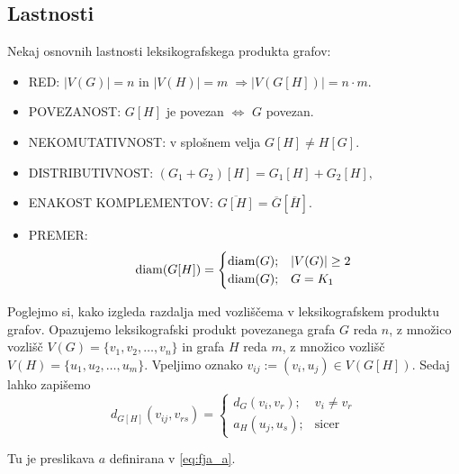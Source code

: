 \documentclass[mat1, tisk]{fmfdelo}
\newcommand{\1}{(1, 1, \ldots, 1)}
\newcommand{\2}{(2, 2, \ldots, 2)}
\begin{document}


\subsection{Lastnosti} \label{ss:lastnosti_leks_prod}
Nekaj osnovnih lastnosti leksikografskega produkta grafov:
\begin{itemize}
    \item RED: $|V(G)| = n$ in $|V(H)| = m \; \Rightarrow |V(G[H])| = n \cdot m.$
    \item POVEZANOST: $G[H]$ je povezan $\Leftrightarrow$ $G$ povezan. 
    \item NEKOMUTATIVNOST: v splošnem velja $G[H] \neq H[G].$
    \item DISTRIBUTIVNOST: $(G_1 + G_2)[H] = G_1[H] + G_2[H],$ 
    \item ENAKOST KOMPLEMENTOV: $\overline{G[H]} = \overline{G} [\overline{H}].$
    \item PREMER: $$ {\rm diam}(G[H]) =  \begin{cases} 
        {\rm diam}(G); & |V(G)| \geq 2 \\
        {\rm diam}(G); & G = K_1
        \end{cases}$$

\end{itemize}

Poglejmo si, kako izgleda razdalja med vozliščema v leksikografskem produktu grafov. 
Opazujemo leksikografski produkt povezanega grafa $G$ reda $n$, z množico vozlišč
$V(G) = \{v_1, v_2, \ldots , v_n \}$ in grafa $H$ reda $m$, z množico vozlišč 
$V(H) = \{u_1, u_2, \ldots , u_m \}$. Vpeljimo oznako 
$v_{ij} := (v_i, u_j) \in V(G[H]).$
Sedaj lahko zapišemo
\begin{equation} \label{eq:razdalja_produkta}
    d_{G[H]}(v_{ij}, v_{rs}) = 
    \begin{cases}
        d_G(v_i, v_r); & v_i \neq v_r \\
        a_H(u_j, u_s); & \text{sicer}
    \end{cases}
\end{equation} 

Tu je preslikava $a$ definirana v \ref{eq:fja_a}.


\end{document}
